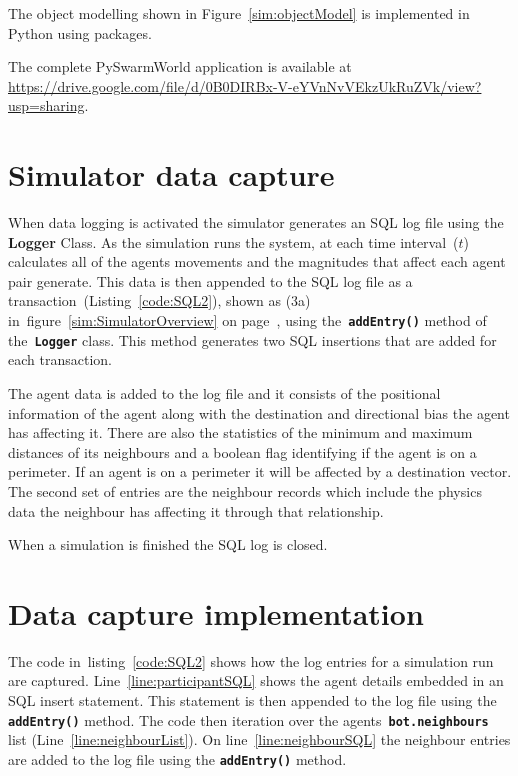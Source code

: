 The object modelling shown in Figure~\ref{sim:objectModel} is implemented in Python using packages.

The complete PySwarmWorld application is available at \url{https://drive.google.com/file/d/0B0DIRBx-V-eYVnNvVEkzUkRuZVk/view?usp=sharing}.

\section{Simulator data capture}

When data logging is activated the simulator generates an SQL log file using the \textbf{Logger} Class. As the simulation runs the system, at each time interval~($t$) calculates all of the agents movements and the magnitudes that affect each agent pair generate. This data is then appended to the SQL log file as a transaction~(Listing~\ref{code:SQL2}), shown as (3a) in~figure~\ref{sim:SimulatorOverview} on page~\pageref{sim:SimulatorOverview}, using the~\texttt{\textbf{addEntry()}} method of the~\texttt{\textbf{Logger}} class. This method generates two SQL insertions that are added for each transaction. 

The agent data is added to the log file and it consists of the positional information of the agent along with the destination and directional bias the agent has affecting it. There are also the statistics of the minimum and maximum distances of its neighbours and a boolean flag identifying if the agent is on a perimeter. If an agent is on a perimeter it will be affected by a destination vector. The second set of entries are the neighbour records which include the physics data the neighbour has affecting it through that relationship. 

When a simulation is finished the SQL log is closed. 

\section{Data capture implementation}
The code in~listing~\ref{code:SQL2} shows how the log entries for a simulation run are captured. Line~\ref{line:participantSQL} shows the agent details embedded in an SQL insert statement. This statement is then appended to the log file using the \texttt{\textbf{addEntry()}} method. The code then iteration over the agents~\texttt{\textbf{bot.neighbours}} list (Line~\ref{line:neighbourList}). On line~\ref{line:neighbourSQL} the neighbour entries are added to the log file using the \texttt{\textbf{addEntry()}} method.

